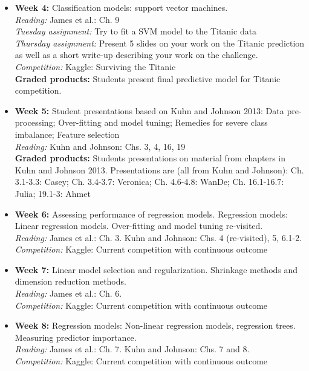 \documentclass[11pt,oneside]{amsart}
\begin{document}
\begin{itemize}
\item \textbf{Week 4:} Classification models: support vector
  machines.\\
\emph{Reading:} James et al.: Ch. 9\\
\emph{Tuesday assignment:} Try to fit a SVM model to the Titanic data\\
\emph{Thursday assignment:} Present 5 slides on your work on the Titanic prediction as well as a short write-up describing your work on the challenge.\\
\emph{Competition:} Kaggle: Surviving the Titanic\\
\textbf{Graded products:} Students present final predictive model for Titanic
competition.

\item \textbf{Week 5:} Student presentations based on Kuhn and Johnson
  2013: Data pre-processing; Over-fitting and model tuning; Remedies
  for severe class imbalance; Feature selection\\
\emph{Reading:} Kuhn and Johnson: Chs. 3, 4, 16, 19\\
\textbf{Graded products:} Students presentations on material from chapters in Kuhn and
Johnson 2013. Presentations are (all from Kuhn and Johnson): Ch. 3.1-3.3: Casey; Ch. 3.4-3.7: Veronica; Ch. 4.6-4.8: WanDe; Ch. 16.1-16.7: Julia; 19.1-3: Ahmet\\

\item \textbf{Week 6:} Assessing performance of regression
  models. Regression models: Linear regression models. Over-fitting
  and model tuning re-visited.\\
\emph{Reading:} James et al.: Ch. 3. Kuhn and Johnson: Chs. 4
(re-visited), 5, 6.1-2.\\
\emph{Competition:} Kaggle: Current competition with continuous
outcome

\item \textbf{Week 7:} Linear model selection and
  regularization. Shrinkage methods and dimension reduction methods.\\
\emph{Reading:} James et al.: Ch. 6.\\
\emph{Competition:} Kaggle: Current competition with continuous
outcome

\item \textbf{Week 8:} Regression models: Non-linear regression
  models, regression trees. Measuring predictor importance.\\
\emph{Reading:} James et al.: Ch. 7. Kuhn and Johnson: Chs. 7 and 8.\\
\emph{Competition:} Kaggle: Current competition with continuous
outcome


\end{itemize}
\end{document}
